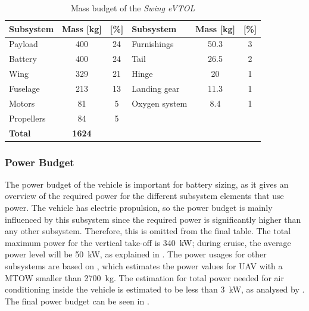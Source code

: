 \begin{table}[H]
    \centering
    \caption{Mass budget of the \textit{Swing eVTOL}}
    \label{tab:mass_budget}
    \begin{tabular}{lS[table-format=4]S[table-format=2]|lS[table-format=2.1]S[table-format=1]}
    \toprule
         \textbf{Subsystem} & \textbf{Mass [\unit{kg}]} & \textbf{[\unit{\%}]} & \textbf{Subsystem} & \textbf{Mass [\unit{kg}]} & \textbf{[\unit{\%}]} \\ \midrule
         Payload & 400 & 24 & Furnishings & 50.3& 3\\
         Battery & 400 & 24 & Tail & 26.5 & 2 \\
         Wing & 329 & 21 & Hinge & 20 & 1 \\
         Fuselage & 213 & 13 & Landing gear & 11.3 & 1 \\
         Motors & 81 & 5 &  Oxygen system & 8.4 & 1 \\
         Propellers & 84 & 5 & & &\\ \midrule 
    \textbf{Total} &           \textbf{1624} \\ \bottomrule    
    \end{tabular}
    
\end{table}


\subsubsection{Power Budget}
The power budget of the vehicle is important for battery sizing, as it gives an overview of the required power for the different subsystem elements that use power. The vehicle has electric propulsion, so the power budget is mainly influenced by this subsystem since the required power is significantly higher than any other subsystem. Therefore, this is omitted from the final table. The total maximum power for the vertical take-off is \qty{340}{kW}; during cruise, the average power level will be \qty{50}{kW}, as explained in .
The power usages for other subsystems are based on \textcite{pranoto2016electrical},
which estimates the power values for UAV with a MTOW smaller than \qty{2700}{kg}.
The estimation for total power needed for air conditioning inside the vehicle is estimated to be less than \qty{3}{kW},
as analysed by \textcite{farrington2000impact}.
The final power budget can be seen in .



